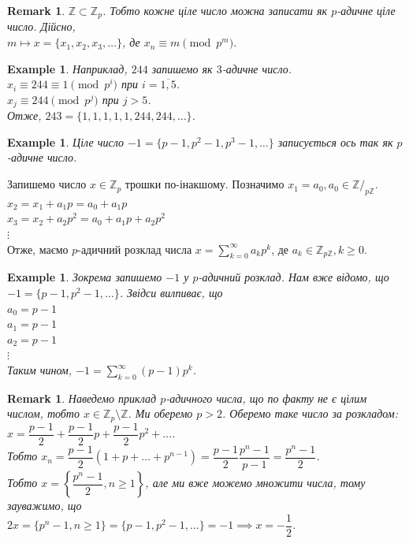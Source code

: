 \documentclass[a4paper, 10pt]{article}
\theoremstyle{theoremdd}
\theoremstyle{theoremdd}
\theoremstyle{theoremdd}
\theoremstyle{theoremdd}
\newtheorem{example}[theorem]{Example}
\theoremstyle{theoremdd}
\theoremstyle{theoremdd}
\newtheorem{remark}[theorem]{Remark}
\theoremstyle{theoremdd}
\theoremstyle{theoremdd}
\begin{document}
\begin{remark}
$\mathbb{Z} \subset \mathbb{Z}_p$. Тобто кожне ціле число можна записати як $p$-адичне ціле число. Дійсно,\\
$m \mapsto x = \{x_1,x_2,x_3,\dots\}$, де $x_n \equiv m \pmod {p^m}$.
\end{remark}

\begin{example}
Наприклад, $244$ запишемо як $3$-адичне число.\\
$x_i \equiv 244 \equiv 1 \pmod {p^i}$ при $i = \overline{1,5}$.\\
$x_j \equiv 244 \pmod {p^j}$ при $j > 5$.\\
Отже, $243 = \{1,1,1,1,1,244,244,\dots\}$.
\end{example}

\begin{example}
Ціле число $-1 = \{p-1,p^2-1,p^3-1,\dots\}$ записується ось так як $p$-адичне число.
\end{example}

Запишемо число $x \in \mathbb{Z}_p$ трошки по-інакшому. Позначимо $x_1 = a_0, a_0 \in \mathbb{Z}/_{p\mathbb{Z}}$.\\
$x_2 = x_1 + a_1p = a_0 + a_1p$\\
$x_3 = x_2 + a_2p^2 = a_0 + a_1p + a_2p^2$\\
$\vdots$\\
Отже, маємо $p$-адичний розклад числа $x = \displaystyle\sum_{k=0}^\infty a_k p^k$, де $a_k \in \mathbb{Z}_{p \mathbb{Z}}, k \geq 0$.

\begin{example}
Зокрема запишемо $-1$ у $p$-адичний розклад. Нам вже відомо, що $-1 = \{p-1,p^2-1,\dots\}$. Звідси вилпиває, що\\
$a_0 = p-1$\\
$a_1 = p-1$\\
$a_2 = p-1$\\
$\vdots$\\
Таким чином, $-1 = \displaystyle\sum_{k=0}^\infty (p-1) p^k$.
\end{example}

\begin{remark}
Наведемо приклад $p$-адичного числа, що по факту не є цілим числом, тобто $x \in \mathbb{Z}_p \setminus \mathbb{Z}$. Ми оберемо $p > 2$. Оберемо таке число за розкладом:\\
$x = \dfrac{p-1}{2} + \dfrac{p-1}{2}p + \dfrac{p-1}{2}p^2 + \dots$.\\
Тобто $x_n = \dfrac{p-1}{2}(1+p+\dots+p^{n-1}) = \dfrac{p-1}{2} \dfrac{p^n-1}{p-1} = \dfrac{p^n-1}{2}$.\\
Тобто $x = \left\{ \dfrac{p^n-1}{2}, n \geq 1 \right\}$, але ми вже можемо множити числа, тому зауважимо, що\\
$2 x = \{p^n-1, n \geq 1\} = \{p-1,p^2-1,\dots\} = -1 \implies x = -\dfrac{1}{2}$.
\end{remark}
\end{document}
